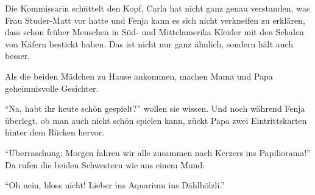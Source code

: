 Die Kommissarin schüttelt den Kopf, Carla hat nicht ganz genau verstanden, was Frau Studer-Matt vor hatte und Fenja kann es sich nicht verkneifen zu erklären, dass schon früher Menschen in Süd- und Mittelamerika Kleider mit den Schalen von Käfern bestickt haben. Das ist nicht nur ganz ähnlich, sondern hält auch besser. 

Als die beiden Mädchen zu Hause ankommen, machen Mama und Papa geheimnisvolle Gesichter. 

\enquote{Na, habt ihr heute schön gespielt?} wollen sie wissen. Und noch während Fenja überlegt, ob man auch nicht schön spielen kann, zückt Papa zwei Eintrittskarten hinter dem Rücken hervor.

\enquote{Überraschung: Morgen fahren wir alle zusammen nach Kerzers ins Papiliorama!} Da rufen die beiden Schwestern wie aus einem Mund:

\enquote{Oh nein, bloss nicht! Lieber ins Aquarium ins Dählhölzli.} \hfill {\color{DeepPink}\decofourleft}
